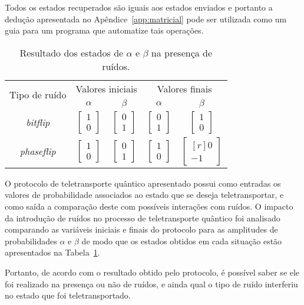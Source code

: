 Todos os estados recuperados são iguais aos estados enviados e portanto a dedução apresentada no Apêndice~\ref{app:matricial} pode ser utilizada como um guia para um programa que automatize tais operações.
\begin{table}[ht!]
  \centering
  \caption{Resultado dos estados de $\alpha$ e $\beta$ na presença de ruídos.}\label{tab:resultadoruidos}
  \begin{tabular}{ccccc}
    \toprule
    \multirow{2}{*}{Tipo de ruído} & \multicolumn{2}{c}{Valores iniciais} & \multicolumn{2}{c}{Valores finais}                                     \\
    \cmidrule{2-5}
                                   & $\alpha$ & $\beta$ & $\alpha$ & $\beta$ \\
    \midrule
    \textit{bitflip}   & $\begin{bmatrix} 1 \\ 0 \end{bmatrix}$ & $\begin{bmatrix} 0 \\ 1 \end{bmatrix}$ & $\begin{bmatrix} 0 \\ 1 \end{bmatrix}$ & $\begin{bmatrix} 1 \\ 0 \end{bmatrix}$ \\
    \textit{phaseflip} & $\begin{bmatrix} 1 \\ 0 \end{bmatrix}$ & $\begin{bmatrix} 0 \\ 1 \end{bmatrix}$ & $\begin{bmatrix} 1 \\ 0 \end{bmatrix}$ & $\begin{bmatrix*}[r] 0 \\ -1 \end{bmatrix*}$ \\
    \bottomrule
  \end{tabular}
\end{table}
O protocolo de teletransporte quântico apresentado possui como entradas os valores de probabilidade associados ao estado que se deseja teletransportar, e como saída a comparação deste com possíveis interações com ruídos. O impacto da introdução de ruídos no processo de teletransporte quântico foi analisado comparando as variáveis iniciais e finais do protocolo para as amplitudes de probabilidades $\alpha$ e $\beta$ de modo que os estados obtidos em cada situação estão apresentados na Tabela~\ref{tab:resultadoruidos}.

Portanto, de acordo com o resultado obtido pelo protocolo, é possível saber se ele foi realizado na presença ou não de ruídos, e ainda qual o tipo de ruído interferiu no estado que foi teletransportado.

